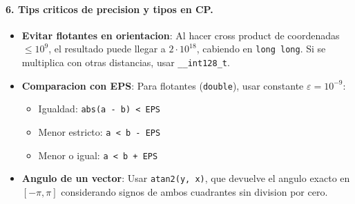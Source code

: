 \begin{center}
\end{center}

\paragraph{6. Tips criticos de precision y tipos en CP.}
\begin{itemize}\setlength\itemsep{0pt}
	\item \textbf{Evitar flotantes en orientacion}: Al hacer cross product de coordenadas $\le 10^9$, el resultado puede llegar a $2 \cdot 10^{18}$, cabiendo en \texttt{long long}. Si se multiplica con otras distancias, usar \verb|__int128_t|.
	\item \textbf{Comparacion con EPS}: Para flotantes (\texttt{double}), usar constante $\varepsilon = 10^{-9}$:
	\begin{itemize}\setlength\itemsep{0pt}
		\item Igualdad: \verb|abs(a - b) < EPS|
		\item Menor estricto: \verb|a < b - EPS|
		\item Menor o igual: \verb|a < b + EPS|
	\end{itemize}
	\item \textbf{Angulo de un vector}: Usar \verb|atan2(y, x)|, que devuelve el angulo exacto en $[-\pi, \pi]$ considerando signos de ambos cuadrantes sin division por cero.
\end{itemize}
\vspace{0.5em}
